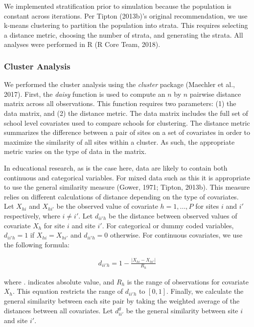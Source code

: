 \documentclass[man,floatsintext]{apa6}
\begin{document}
We implemented stratification prior to simulation because the population is constant across iterations. Per Tipton (2013b)'s original recommendation, we use k-means clustering to partition the population into strata. This requires selecting a distance metric, choosing the number of strata, and generating the strata. All analyses were performed in R (R Core Team, 2018).

\hypertarget{cluster-analysis}{%
\subsubsection{Cluster Analysis}\label{cluster-analysis}}

We performed the cluster analysis using the \emph{cluster} package (Maechler et al., 2017). First, the \emph{daisy} function is used to compute an \(n\) by \(n\) pairwise distance matrix across all observations. This function requires two parameters: (1) the data matrix, and (2) the distance metric. The data matrix includes the full set of school level covariates used to compare schools for clustering. The distance metric summarizes the difference between a pair of sites on a set of covariates in order to maximize the similarity of all sites within a cluster. As such, the appropriate metric varies on the type of data in the matrix.

In educational research, as is the case here, data are likely to contain both continuous and categorical variables. For mixed data such as this it is appropriate to use the general similarity measure (Gower, 1971; Tipton, 2013b). This measure relies on different calculations of distance depending on the type of covariates. Let \(X_{hi}\) and \(X_{hi'}\) be the observed value of covariate \(h = {1, ..., P}\) for sites \(i\) and \(i'\) respectively, where \(i \ne i'\). Let \(d_{ii'h}\) be the distance between observed values of covariate \(X_{h}\) for site \(i\) and site \(i'\). For categorical or dummy coded variables, \(d_{ii'h} = 1\) if \(X_{hi} = X_{hi'}\) and \(d_{ii'h} = 0\) otherwise. For continuous covariates, we use the following formula:

\begin{align}
  d_{ii'h} = 1 - \frac{|X_{hi} - X_{hi'}|}{R_h}
\end{align}

where \textbar{}.\textbar{} indicates absolute value, and \(R_h\) is the range of observations for covariate \(X_h\). This equation restricts the range of \(d_{ii'h}\) to \([0,1]\). Finally, we calculate the general similarity between each site pair by taking the weighted average of the distances between all covariates. Let \(d^{g}_{ii'}\) be the general similarity between site \(i\) and site \(i'\).
\end{document}
